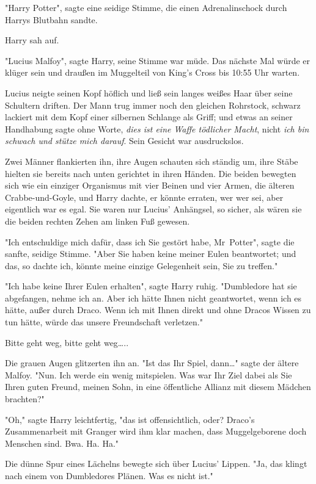 {"Harry Potter", sagte eine seidige Stimme, die einen Adrenalinschock durch Harrys Blutbahn sandte.

Harry sah auf.

"Lucius Malfoy", sagte Harry, seine Stimme war müde. Das nächste Mal würde er klüger sein und draußen im Muggelteil von King's Cross bis 10:55 Uhr warten.

Lucius neigte seinen Kopf höflich und ließ sein langes weißes Haar über seine Schultern driften. Der Mann trug immer noch den gleichen Rohrstock, schwarz lackiert mit dem Kopf einer silbernen Schlange als Griff; und etwas an seiner Handhabung sagte ohne Worte, \emph{dies ist eine Waffe tödlicher Macht}, nicht \emph{ich bin schwach und stütze mich darauf}. Sein Gesicht war ausdruckslos.

Zwei Männer flankierten ihn, ihre Augen schauten sich ständig um, ihre Stäbe hielten sie bereits nach unten gerichtet in ihren Händen. Die beiden bewegten sich wie ein einziger Organismus mit vier Beinen und vier Armen, die älteren Crabbe-und-Goyle, und Harry dachte, er könnte erraten, wer wer sei, aber eigentlich war es egal. Sie waren nur Lucius' Anhängsel, so sicher, als wären sie die beiden rechten Zehen am linken Fuß gewesen.

"Ich entschuldige mich dafür, dass ich Sie gestört habe, Mr~Potter", sagte die sanfte, seidige Stimme. "Aber Sie haben keine meiner Eulen beantwortet; und das, so dachte ich, könnte meine einzige Gelegenheit sein, Sie zu treffen."

"Ich habe keine Ihrer Eulen erhalten", sagte Harry ruhig. "Dumbledore hat sie abgefangen, nehme ich an. Aber ich hätte Ihnen nicht geantwortet, wenn ich es hätte, außer durch Draco. Wenn ich mit Ihnen direkt und ohne Dracos Wissen zu tun hätte, würde das unsere Freundschaft verletzen."

Bitte geht weg, bitte geht weg…..

Die grauen Augen glitzerten ihn an. "Ist das Ihr Spiel, dann…" sagte der ältere Malfoy. "Nun. Ich werde ein wenig mitspielen. Was war Ihr Ziel dabei als Sie Ihren guten Freund, meinen Sohn, in eine öffentliche Allianz mit diesem Mädchen brachten?"

"Oh," sagte Harry leichtfertig, "das ist offensichtlich, oder? Draco's Zusammenarbeit mit Granger wird ihm klar machen, dass Muggelgeborene doch Menschen sind. Bwa. Ha. Ha."

Die dünne Spur eines Lächelns bewegte sich über Lucius' Lippen. "Ja, das klingt nach einem von Dumbledores Plänen. Was es nicht ist."

}
